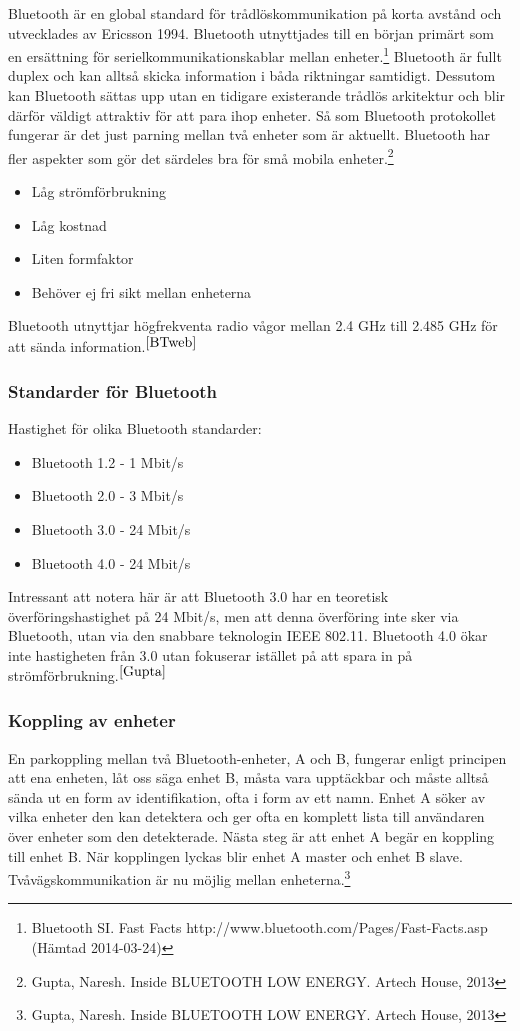 \documentclass[a4paper,12pt,fleqn]{article}
\begin{document}
Bluetooth är en global standard för trådlöskommunikation på korta avstånd och utvecklades av Ericsson 1994. Bluetooth utnyttjades till en början primärt som en ersättning för serielkommunikationskablar mellan enheter.\footnote{\label{BTweb}Bluetooth SI. Fast Facts http://www.bluetooth.com/Pages/Fast-Facts.asp (Hämtad 2014-03-24)}
Bluetooth är fullt duplex och kan alltså skicka information i båda riktningar samtidigt. Dessutom kan Bluetooth sättas upp utan en tidigare existerande trådlös arkitektur och blir därför väldigt attraktiv för att para ihop enheter. Så som Bluetooth protokollet fungerar är det just parning mellan två enheter som är aktuellt. Bluetooth har fler aspekter som gör det särdeles bra för små mobila enheter.\footnote{\label{Gupta}Gupta, Naresh. Inside BLUETOOTH LOW ENERGY. Artech House, 2013}
\begin{itemize}
\item Låg strömförbrukning 
\item Låg kostnad
\item Liten formfaktor
\item Behöver ej fri sikt mellan enheterna
\end{itemize}

Bluetooth utnyttjar högfrekventa radio vågor mellan 2.4 GHz till 2.485 GHz för att sända information.$^{\ref{BTweb}}$

\subsubsection{Standarder för Bluetooth}
Hastighet för olika Bluetooth standarder:
\begin{itemize}
\item Bluetooth 1.2 - 1 Mbit/s 
\item Bluetooth 2.0 - 3 Mbit/s
\item Bluetooth 3.0 - 24 Mbit/s
\item Bluetooth 4.0 - 24 Mbit/s
\end{itemize}

Intressant att notera här är att Bluetooth 3.0 har en teoretisk överföringshastighet på 24 Mbit/s, men att denna överföring inte sker via Bluetooth, utan via den snabbare teknologin IEEE 802.11. 
Bluetooth 4.0 ökar inte hastigheten från 3.0 utan fokuserar istället på att spara in på strömförbrukning.$^{\ref{Gupta}}$


\subsubsection{Koppling av enheter}
En parkoppling mellan två Bluetooth-enheter, A och B, fungerar enligt principen att ena enheten, låt oss säga enhet B, måsta vara upptäckbar och måste alltså sända ut en form av identifikation, ofta i form av ett namn. Enhet A söker av vilka enheter den kan detektera och ger ofta en komplett lista till användaren över enheter som den detekterade. Nästa steg är att enhet A begär en koppling till enhet B. När kopplingen lyckas blir enhet A master och enhet B slave. Tvåvägskommunikation är nu möjlig mellan enheterna.\footnote{Gupta, Naresh. Inside BLUETOOTH LOW ENERGY. Artech House, 2013}
\end{document}
